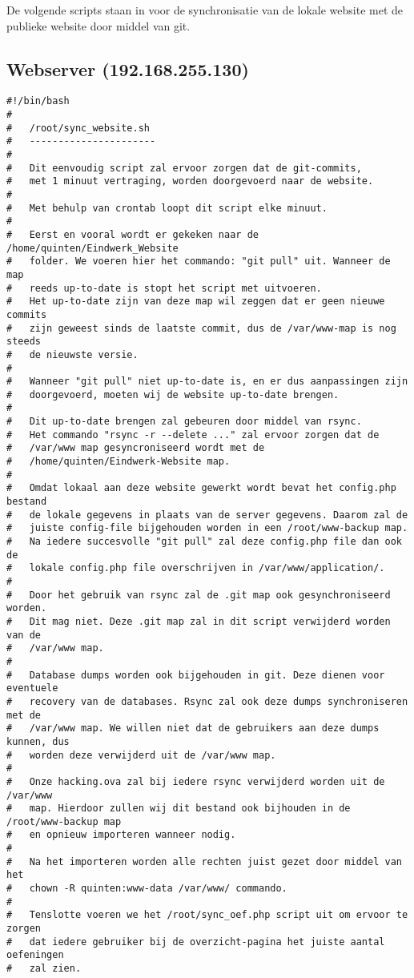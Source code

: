 De volgende scripts staan in voor de synchronisatie van de lokale website met de publieke website door middel van git.
\subsection{Webserver (192.168.255.130)}
\begin{lstlisting}
#!/bin/bash
#      
#	/root/sync_website.sh
#	----------------------
#
#	Dit eenvoudig script zal ervoor zorgen dat de git-commits,
#	met 1 minuut vertraging, worden doorgevoerd naar de website.
#
#	Met behulp van crontab loopt dit script elke minuut.
#
#	Eerst en vooral wordt er gekeken naar de /home/quinten/Eindwerk_Website
#	folder. We voeren hier het commando: "git pull" uit. Wanneer de map 
#	reeds up-to-date is stopt het script met uitvoeren.
#	Het up-to-date zijn van deze map wil zeggen dat er geen nieuwe commits
#	zijn geweest sinds de laatste commit, dus de /var/www-map is nog steeds
#	de nieuwste versie.
#
#	Wanneer "git pull" niet up-to-date is, en er dus aanpassingen zijn
#	doorgevoerd, moeten wij de website up-to-date brengen.
#
#	Dit up-to-date brengen zal gebeuren door middel van rsync.
#	Het commando "rsync -r --delete ..." zal ervoor zorgen dat de
#	/var/www map gesyncroniseerd wordt met de 
#	/home/quinten/Eindwerk-Website map.
#
#	Omdat lokaal aan deze website gewerkt wordt bevat het config.php bestand
#	de lokale gegevens in plaats van de server gegevens. Daarom zal de
#	juiste config-file bijgehouden worden in een /root/www-backup map.
#	Na iedere succesvolle "git pull" zal deze config.php file dan ook de 
#	lokale config.php file overschrijven in /var/www/application/.
#
#	Door het gebruik van rsync zal de .git map ook gesynchroniseerd worden.
#	Dit mag niet. Deze .git map zal in dit script verwijderd worden van de 
#	/var/www map.
#
#	Database dumps worden ook bijgehouden in git. Deze dienen voor eventuele
#	recovery van de databases. Rsync zal ook deze dumps synchroniseren met de
#	/var/www map. We willen niet dat de gebruikers aan deze dumps kunnen, dus
#	worden deze verwijderd uit de /var/www map.
#
#	Onze hacking.ova zal bij iedere rsync verwijderd worden uit de /var/www
#	map. Hierdoor zullen wij dit bestand ook bijhouden in de /root/www-backup map
#	en opnieuw importeren wanneer nodig.
#
#	Na het importeren worden alle rechten juist gezet door middel van het 
#	chown -R quinten:www-data /var/www/ commando.
#
#	Tenslotte voeren we het /root/sync_oef.php script uit om ervoor te zorgen
#	dat iedere gebruiker bij de overzicht-pagina het juiste aantal oefeningen
#	zal zien.
   

\end{lstlisting}

